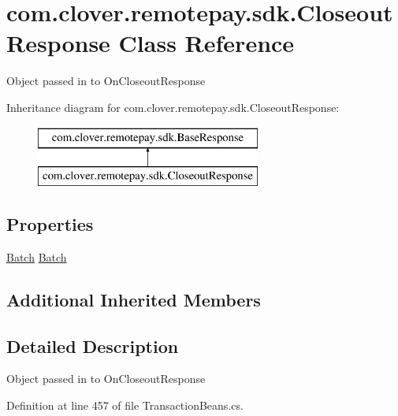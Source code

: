 \hypertarget{classcom_1_1clover_1_1remotepay_1_1sdk_1_1_closeout_response}{}\section{com.\+clover.\+remotepay.\+sdk.\+Closeout\+Response Class Reference}
\label{classcom_1_1clover_1_1remotepay_1_1sdk_1_1_closeout_response}


Object passed in to On\+Closeout\+Response  


Inheritance diagram for com.\+clover.\+remotepay.\+sdk.\+Closeout\+Response\+:\begin{figure}[H]
\begin{center}
\leavevmode
\includegraphics[height=2.000000cm]{classcom_1_1clover_1_1remotepay_1_1sdk_1_1_closeout_response}
\end{center}
\end{figure}
\subsection*{Properties}
\begin{DoxyCompactItemize}
\item 
\hyperlink{classcom_1_1clover_1_1sdk_1_1v3_1_1payments_1_1_batch}{Batch} \hyperlink{classcom_1_1clover_1_1remotepay_1_1sdk_1_1_closeout_response_a738d2647e57079c997ca44d5ac5317e1}{Batch}
\end{DoxyCompactItemize}
\subsection*{Additional Inherited Members}


\subsection{Detailed Description}
Object passed in to On\+Closeout\+Response 



Definition at line 457 of file Transaction\+Beans.\+cs.



